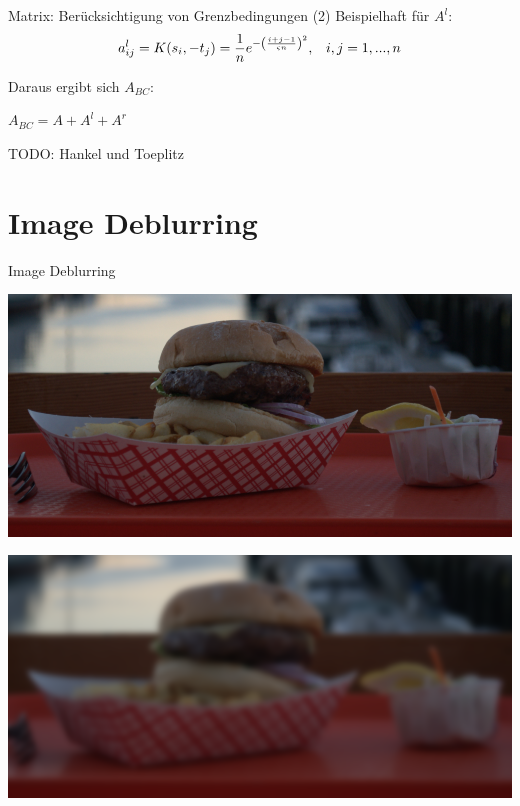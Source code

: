 \documentclass[11pt]{beamer}
\begin{document}
\begin{frame}{Matrix: Berücksichtigung von Grenzbedingungen (2)}
Beispielhaft für $A^l$:
\[
a^l_{ij} = K(s_i, -t_j) = \frac{1}{n} e^{-\left(i+j-1 \over \varsigma n\right)^2}, \,\,\,\,\, i,j = 1, ..., n
\]

Daraus ergibt sich $A_{BC}$:

\begin{center}
$A_{BC} = A + A^l + A^r$ 
\end{center}
\end{frame}


\begin{frame}
TODO: Hankel und Toeplitz
\end{frame}


\section{Image Deblurring}
\begin{frame}{Image Deblurring}
\begin{center}
\includegraphics[scale=1]{Burger_unblurred} 


\includegraphics[scale=1]{Burger_blurred} 
\end{center}
\end{frame}
\end{document}
